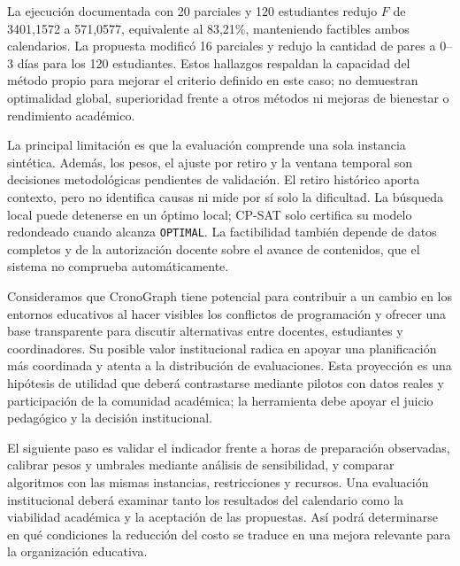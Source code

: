 \documentclass[conference]{IEEEtran}
\begin{document}
La ejecución documentada con 20 parciales y 120 estudiantes redujo $F$ de 3401,1572 a 571,0577, equivalente al 83,21\%, manteniendo factibles ambos calendarios. La propuesta modificó 16 parciales y redujo la cantidad de pares a 0--3 días para los 120 estudiantes. Estos hallazgos respaldan la capacidad del método propio para mejorar el criterio definido en este caso; no demuestran optimalidad global, superioridad frente a otros métodos ni mejoras de bienestar o rendimiento académico.

La principal limitación es que la evaluación comprende una sola instancia sintética. Además, los pesos, el ajuste por retiro y la ventana temporal son decisiones metodológicas pendientes de validación. El retiro histórico aporta contexto, pero no identifica causas ni mide por sí solo la dificultad. La búsqueda local puede detenerse en un óptimo local; CP-SAT solo certifica su modelo redondeado cuando alcanza \texttt{OPTIMAL}. La factibilidad también depende de datos completos y de la autorización docente sobre el avance de contenidos, que el sistema no comprueba automáticamente.

Consideramos que CronoGraph tiene potencial para contribuir a un cambio en los entornos educativos al hacer visibles los conflictos de programación y ofrecer una base transparente para discutir alternativas entre docentes, estudiantes y coordinadores. Su posible valor institucional radica en apoyar una planificación más coordinada y atenta a la distribución de evaluaciones. Esta proyección es una hipótesis de utilidad que deberá contrastarse mediante pilotos con datos reales y participación de la comunidad académica; la herramienta debe apoyar el juicio pedagógico y la decisión institucional.

El siguiente paso es validar el indicador frente a horas de preparación observadas, calibrar pesos y umbrales mediante análisis de sensibilidad, y comparar algoritmos con las mismas instancias, restricciones y recursos. Una evaluación institucional deberá examinar tanto los resultados del calendario como la viabilidad académica y la aceptación de las propuestas. Así podrá determinarse en qué condiciones la reducción del costo se traduce en una mejora relevante para la organización educativa.
\end{document}
